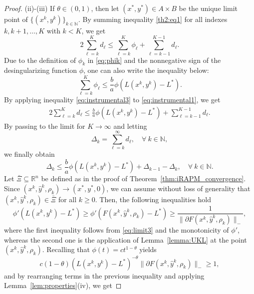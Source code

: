 \documentclass[pdflatex,sn-mathphys-num]{sn-jnl}
\numberwithin{equation}{section}%
\def\R{\mathbb{R}}
\def\N{\mathbb{N}}
\theoremstyle{thmstyleone}%
\theoremstyle{thmstyletwo}%
\theoremstyle{thmstylethree}%
\begin{document}
\begin{proof}
(ii)-(iii) If $\theta\in (0,1)$, then let $(x^*,y^*)\in A\times B$ be the unique limit point of $\{(x^k,y^k)\}_{k\in\N}$. By summing inequality \eqref{th2:eq1} for all indexes $k,k+1,\ldots,K$ with $k<K$, we get
\begin{equation}\label{eq:instrumental1}
    2\sum_{\ell = k}^Kd_\ell \leq \sum_{\ell = k}^K\phi_\ell+\sum_{\ell = k-1}^{K-1}d_\ell.
\end{equation}
Due to the definition of $\phi_k$ in \eqref{eq:phik} and the nonnegative sign of the desingularizing function $\phi$, one can also write the inequality below:
\begin{equation}\label{eq:instrumental3}
    \sum_{\ell=k}^K\phi_\ell \leq \frac{b}{a}\phi(L(x^k,y^k)-L^*).
\end{equation}
By applying inequality \eqref{eq:instrumental3} to \eqref{eq:instrumental1}, we get
\begin{align*}
    2\sum_{\ell=k}^Kd_\ell \leq \frac{b}{a}\phi(L(x^k,y^k)-L^*)+\sum_{\ell = k-1}^{K-1}d_\ell. 
\end{align*}
By passing to the limit for $K\rightarrow \infty$ and letting  
\begin{equation*}
\Delta_k = \sum_{\ell = k}^{\infty} d_\ell, \quad \forall \ k\in\N,
\end{equation*}
we finally obtain
\begin{equation}\label{eq:crucial_for_rate}
    \Delta_k \leq \frac{b}{a}\phi(L(x^k,y^k)-L^*)+\Delta_{k-1}-\Delta_k,  \quad \forall \ k\in\mathbb{N}.
\end{equation}
Let $\bar{\Xi}\subseteq \R^n$ be defined as in the proof of Theorem~\ref{thm:iRAPM_convergence}. Since $(x^{k},\hat{y}^{k},\rho_k)\rightarrow (x^*,y^*,0)$, we can assume without loss of generality that $(x^{k},\hat{y}^{k},\rho_k)\in\bar{\Xi}$ for all $k\geq 0$. {Then,  the following inequalities hold}
\begin{equation*}
    \phi'(L(x^k,y^k)-L^*)\geq \phi'(F(x^{k},\hat{y}^{k},\rho_k)-L^*)\geq \frac{1}{\|\partial F(x^{k},\hat{y}^{k},\rho_k)\|_{-}},
\end{equation*}
where the first inequality follows from \eqref{eq:limit3} and the monotonicity of $\phi'$, whereas the second one is the application of Lemma~\ref{lemma:UKL} at the point $(x^{k},\hat{y}^{k},\rho_k)$. Recalling that $\phi(t)=ct^{1-\theta}$ yields
\begin{equation*}
    c(1-\theta)(L(x^k,y^k)-L^*)^{-\theta}\|\partial F(x^{k},\hat{y}^{k},\rho_k)\|_{-}\geq 1,
\end{equation*}
and by rearranging terms in the previous inequality and applying Lemma~\ref{lem:properties}(iv), we get

\end{proof}
\end{document}
